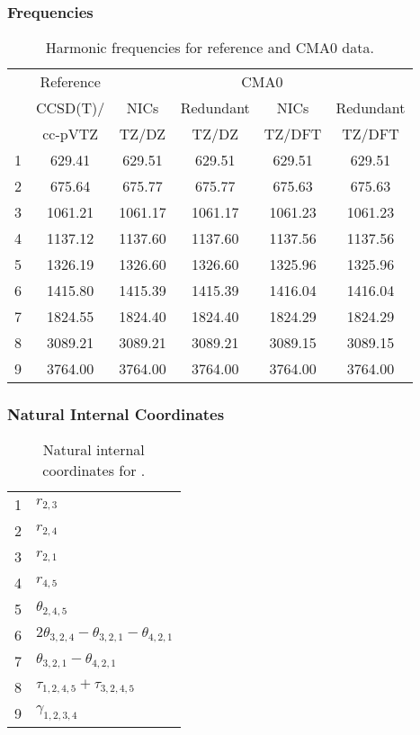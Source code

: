 \documentclass[10pt,oneside]{article}
\begin{document}
\begin{table}[h!]
\subsubsection*{Frequencies}
\centering
\caption{Harmonic frequencies for reference and CMA0 data.}
\begin{tabular}{cccccc}
\toprule
{} & Reference & \multicolumn{4}{c}{CMA0} \\
{} &  CCSD(T)/ &    NICs &  Redundant &    NICs & Redundant \\
{} &   cc-pVTZ &   TZ/DZ &      TZ/DZ &  TZ/DFT &    TZ/DFT \\
\midrule
1 &    629.41 &  629.51 &     629.51 &  629.51 &    629.51 \\
2 &    675.64 &  675.77 &     675.77 &  675.63 &    675.63 \\
3 &   1061.21 & 1061.17 &    1061.17 & 1061.23 &   1061.23 \\
4 &   1137.12 & 1137.60 &    1137.60 & 1137.56 &   1137.56 \\
5 &   1326.19 & 1326.60 &    1326.60 & 1325.96 &   1325.96 \\
6 &   1415.80 & 1415.39 &    1415.39 & 1416.04 &   1416.04 \\
7 &   1824.55 & 1824.40 &    1824.40 & 1824.29 &   1824.29 \\
8 &   3089.21 & 3089.21 &    3089.21 & 3089.15 &   3089.15 \\
9 &   3764.00 & 3764.00 &    3764.00 & 3764.00 &   3764.00 \\
\bottomrule
\end{tabular}
\end{table}

\begin{table}[h!]
\subsubsection*{Natural Internal Coordinates}
\centering
\caption{Natural internal coordinates for .}
\small
\begin{tabular}{ll}
\toprule
  1   & $r_{2,3}$ \\
  2   & $r_{2,4}$ \\
  3   & $r_{2,1}$ \\
  4   & $r_{4,5}$ \\
  5   & $\theta_{2,4,5}$ \\
  6   & $2\theta_{3,2,4} - \theta_{3,2,1} - \theta_{4,2,1}$ \\
  7   & $\theta_{3,2,1} - \theta_{4,2,1}$ \\
  8   & $\tau_{1,2,4,5} + \tau_{3,2,4,5}$ \\
  9   & $\gamma_{1,2,3,4}$ \\
\bottomrule
\end{tabular}
\end{table}
\end{document}
